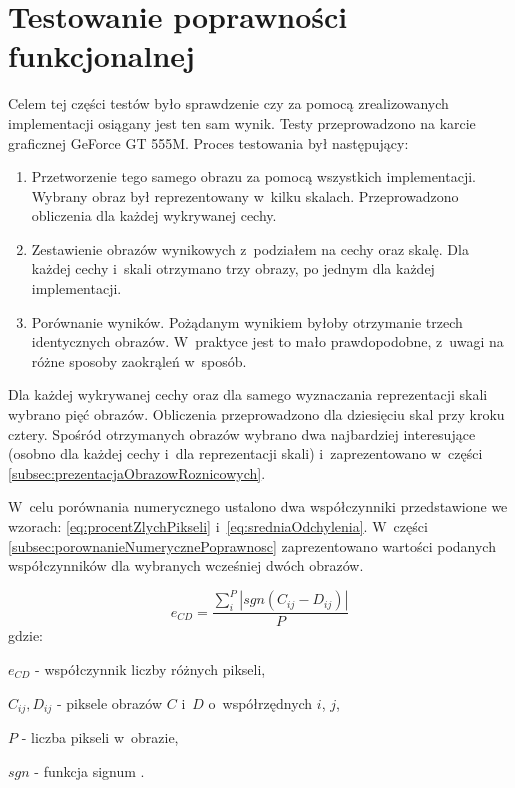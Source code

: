 \section{Testowanie poprawności funkcjonalnej}
\label{sec:testPoprawnosc}

Celem tej części testów było sprawdzenie czy za pomocą zrealizowanych implementacji osiągany jest ten sam wynik. Testy przeprowadzono na karcie graficznej GeForce GT 555M. Proces testowania był następujący:

\begin{enumerate}
\item Przetworzenie tego samego obrazu za pomocą wszystkich implementacji. Wybrany obraz był reprezentowany w~kilku skalach. Przeprowadzono obliczenia dla każdej wykrywanej cechy.
\item Zestawienie obrazów wynikowych z~podziałem na cechy oraz skalę. Dla każdej cechy i~skali otrzymano trzy obrazy, po jednym dla każdej implementacji.
\item Porównanie wyników. Pożądanym wynikiem byłoby otrzymanie trzech identycznych obrazów. W~praktyce jest to mało prawdopodobne, z~uwagi na różne sposoby zaokrąleń w~sposób.
\end{enumerate}

Dla każdej wykrywanej cechy oraz dla samego wyznaczania reprezentacji skali wybrano pięć obrazów. Obliczenia przeprowadzono dla dziesięciu skal przy kroku cztery. Spośród otrzymanych obrazów wybrano dwa najbardziej interesujące (osobno dla każdej cechy i~dla reprezentacji skali) i~zaprezentowano w~części \ref{subsec:prezentacjaObrazowRoznicowych}.

W~celu porównania numerycznego ustalono dwa współczynniki przedstawione we wzorach: \eqref{eq:procentZlychPikseli} i~\eqref{eq:sredniaOdchylenia}. W~części \ref{subsec:porownanieNumerycznePoprawnosc} zaprezentowano wartości podanych współczynników dla wybranych wcześniej dwóch obrazów.

\begin{equation}
\label{eq:procentZlychPikseli}
e_{CD} = \frac{\sum_{i}^{P}|sgn(C_{ij}-D_{ij})	|}{P}
\end{equation}
gdzie:

$ e_{CD} $ - współczynnik liczby różnych pikseli,

$ C_{ij}, D_{ij} $ - piksele obrazów $ C $ i~$ D $ o~współrzędnych $i$, $j$,

$ P $ - liczba pikseli w~obrazie,

$ sgn $ - funkcja signum \cite{Signum}.

